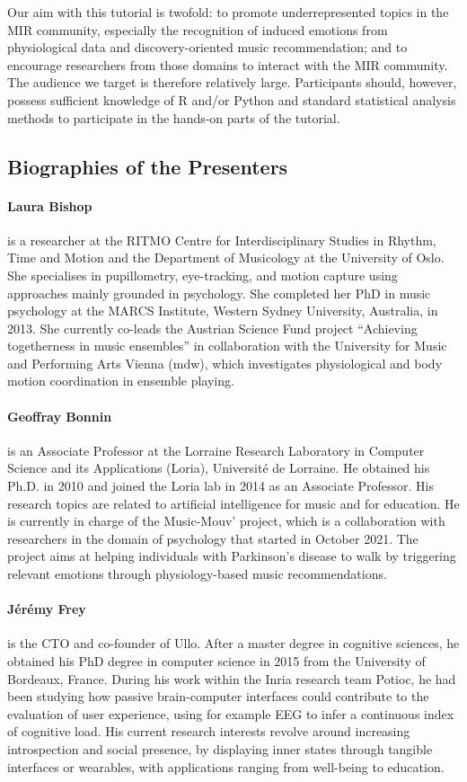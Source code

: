 Our aim with this tutorial is twofold: to promote underrepresented topics in the MIR community, especially the recognition of induced emotions from physiological data and discovery-oriented music recommendation; and to encourage researchers from those domains to interact with the MIR community. The audience we target is therefore relatively large. Participants should, however, possess sufficient knowledge of R and/or Python and standard statistical analysis methods to participate in the hands-on parts of the tutorial.

\subsection*{Biographies of the Presenters}
\paragraph*{Laura Bishop} is a researcher at the RITMO Centre for Interdisciplinary Studies in Rhythm, Time and Motion and the Department of Musicology at the University of Oslo. She specialises in pupillometry, eye-tracking, and motion capture using approaches mainly grounded in psychology. She completed her PhD in music psychology at the MARCS Institute, Western Sydney University, Australia, in 2013. She currently co-leads the Austrian Science Fund project ``Achieving togetherness in music ensembles'' in collaboration with the University for Music and Performing Arts Vienna (mdw), which investigates physiological and body motion coordination in ensemble playing.

\paragraph*{Geoffray Bonnin} is an Associate Professor at the Lorraine Research Laboratory in Computer Science and its Applications (Loria), Université de Lorraine. He obtained his Ph.D. in 2010 and joined the Loria lab in 2014 as an Associate Professor. His research topics are related to artificial intelligence for music and for education. He is currently in charge of the Music-Mouv' project, which is a collaboration with researchers in the domain of psychology that started in October 2021. The project aims at helping individuals with Parkinson's disease to walk by triggering relevant emotions through physiology-based music recommendations.

\paragraph*{Jérémy Frey} is the CTO and co-founder of Ullo. After a master degree in cognitive sciences, he obtained his PhD degree in computer science in 2015 from the University of Bordeaux, France. During his work within the Inria research team Potioc, he had been studying how passive brain-computer interfaces could contribute to the evaluation of user experience, using for example EEG to infer a continuous index of cognitive load. His current research interests revolve around increasing introspection and social presence, by displaying inner states through tangible interfaces or wearables, with applications ranging from well-being to education.

